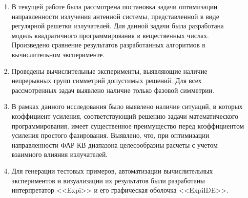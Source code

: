 \begin{enumerate}
  \item В текущей работе была рассмотрена постановка задачи оптимизации направленности излучения антенной системы, представленной в виде регулярной решетки излучателей. Для данной задачи была разработана модель квадратичного программирования в вещественных числах. Произведено сравнение результатов разработанных алгоритмов в вычислительном эксперименте.
  \item Проведены вычислительные эксперименты, выявляющие наличие непрерывных групп симметрий допустимых решений. Для всех рассмотренных задач выявлено наличие только фазовой симметрии.
  \item В рамках данного исследования было выявлено наличие ситуаций, в которых коэффициент усиления, соответствующий решению задачи математического программирования, имеет существенное преимущество перед коэффициентом усиления простого фазирования. Выявлено, что, при оптимизации направленности ФАР КВ диапазона целесообразны расчеты с учетом взаимного влияния излучателей.
  \item Для генерации тестовых примеров, автоматизации вычислительных экспериментов и визуализации их результатов были разработаны интерпретатор <<Expi>> и его графическая оболочка <<ExpiIDE>>.
\end{enumerate}
